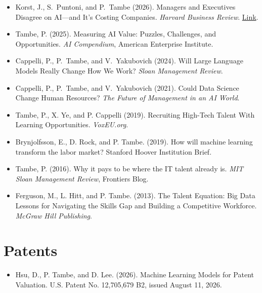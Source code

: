 \documentclass[10pt,letterpaper]{article}
\begin{document}
\begin{itemize}
  \item Korst, J., S.~Puntoni, and P.~Tambe (2026). Managers and Executives Disagree on AI---and It's Costing Companies. \textit{Harvard Business Review}. \href{https://hbr.org/2026/04/managers-and-executives-disagree-on-ai-and-its-costing-companies}{Link}.
  \item Tambe, P. (2025). Measuring AI Value: Puzzles, Challenges, and Opportunities. \textit{AI Compendium}, American Enterprise Institute.
  \item Cappelli, P., P.~Tambe, and V.~Yakubovich (2024). Will Large Language Models Really Change How We Work? \textit{Sloan Management Review}.
\item Cappelli, P., P.~Tambe, and V.~Yakubovich (2021). Could Data Science Change Human Resources? \textit{The Future of Management in an AI World}.
\item Tambe, P., X. Ye, and P. Cappelli (2019). Recruiting High-Tech Talent With Learning Opportunities. \textit{VoxEU.org}.
\item Brynjolfsson, E., D. Rock, and P. Tambe. (2019). How will machine learning transform the labor market? Stanford Hoover Institution Brief.
\item Tambe, P. (2016). Why it pays to be where the IT talent already is.
  \textit{MIT Sloan Management Review}, Frontiers Blog.  
\item Ferguson, M., L. Hitt, and P. Tambe. (2013).
  The Talent Equation: Big Data Lessons for Navigating the Skills Gap and Building a Competitive Workforce. 
  \textit{McGraw Hill Publishing}.
\end{itemize}

\section*{Patents}
\begin{itemize}
\item Hsu, D., P. Tambe, and D. Lee. (2026).
  Machine Learning Models for Patent Valuation. U.S. Patent No. 12,705,679 B2, issued August 11, 2026.
\end{itemize}
\end{document}
